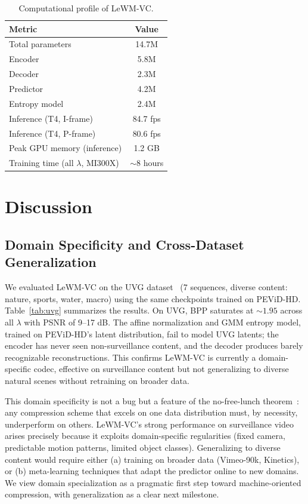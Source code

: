 \documentclass{article}
\begin{document}
\begin{table}[ht]
\centering
\caption{Computational profile of LeWM-VC.}
\label{tab:efficiency}
\begin{tabular}{lc}
\toprule
Metric & Value \\
\midrule
Total parameters & 14.7M \\
Encoder & 5.8M \\
Decoder & 2.3M \\
Predictor & 4.2M \\
Entropy model & 2.4M \\
Inference (T4, I-frame) & 84.7 fps \\
Inference (T4, P-frame) & 80.6 fps \\
Peak GPU memory (inference) & 1.2 GB \\
Training time (all $\lambda$, MI300X) & $\sim$8 hours \\
\bottomrule
\end{tabular}
\end{table}

\section{Discussion}

\subsection{Domain Specificity and Cross-Dataset Generalization}
\label{sec:uvg}

We evaluated LeWM-VC on the UVG dataset~\cite{mercat2020uvg} (7 sequences, diverse content: nature, sports, water, macro) using the same checkpoints trained on PEViD-HD. Table~\ref{tab:uvg} summarizes the results. On UVG, BPP saturates at ${\sim}1.95$ across all $\lambda$ with PSNR of 9--17 dB. The affine normalization and GMM entropy model, trained on PEViD-HD's latent distribution, fail to model UVG latents; the encoder has never seen non-surveillance content, and the decoder produces barely recognizable reconstructions. This confirms LeWM-VC is currently a domain-specific codec, effective on surveillance content but not generalizing to diverse natural scenes without retraining on broader data.

This domain specificity is not a bug but a feature of the no-free-lunch theorem~\cite{wolpert1996no}: any compression scheme that excels on one data distribution must, by necessity, underperform on others. LeWM-VC's strong performance on surveillance video arises precisely because it exploits domain-specific regularities (fixed camera, predictable motion patterns, limited object classes). Generalizing to diverse content would require either (a) training on broader data (Vimeo-90k, Kinetics), or (b) meta-learning techniques that adapt the predictor online to new domains. We view domain specialization as a pragmatic first step toward machine-oriented compression, with generalization as a clear next milestone.
\end{document}
